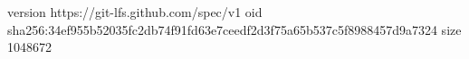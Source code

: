 version https://git-lfs.github.com/spec/v1
oid sha256:34ef955b52035fc2db74f91fd63e7ceedf2d3f75a65b537c5f8988457d9a7324
size 1048672
